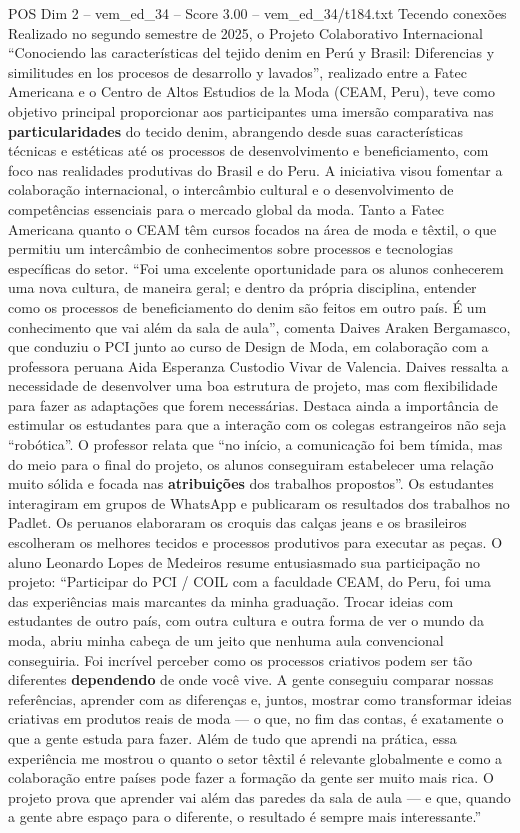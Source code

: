 \begin{textsample}{POS Dim 2 – vem\_ed\_34 – Score 3.00 – vem\_ed\_34/t184.txt}  \label{ex:f2_pos_006}
Tecendo conexões Realizado no segundo semestre de 2025, o Projeto Colaborativo Internacional “Conociendo las características del tejido denim en Perú y Brasil: Diferencias y similitudes en los procesos de desarrollo y lavados”, realizado entre a Fatec Americana e o Centro de Altos Estudios de la Moda (CEAM, Peru), teve como objetivo principal proporcionar aos participantes uma imersão comparativa nas \textbf{particularidades} do tecido denim, abrangendo desde suas características técnicas e estéticas até os processos de desenvolvimento e beneficiamento, com foco nas realidades produtivas do Brasil e do Peru.
A iniciativa visou fomentar a colaboração internacional, o intercâmbio cultural e o desenvolvimento de competências essenciais para o mercado global da moda.
Tanto a Fatec Americana quanto o CEAM têm cursos focados na área de moda e têxtil, o que permitiu um intercâmbio de conhecimentos sobre processos e tecnologias específicas do setor. “Foi uma excelente oportunidade para os alunos conhecerem uma nova cultura, de maneira geral; e dentro da própria disciplina, entender como os processos de beneficiamento do denim são feitos em outro país.
É um conhecimento que vai além da sala de aula”, comenta Daives Araken Bergamasco, que conduziu o PCI junto ao curso de Design de Moda, em colaboração com a professora peruana Aida Esperanza Custodio Vivar de Valencia.
Daives ressalta a necessidade de desenvolver uma boa estrutura de projeto, mas com flexibilidade para fazer as adaptações que forem necessárias.
Destaca ainda a importância de estimular os estudantes para que a interação com os colegas estrangeiros não seja “robótica”.
O professor relata que “no início, a comunicação foi bem tímida, mas do meio para o final do projeto, os alunos conseguiram estabelecer uma relação muito sólida e focada nas \textbf{atribuições} dos trabalhos propostos”.
Os estudantes interagiram em grupos de WhatsApp e publicaram os resultados dos trabalhos no Padlet.
Os peruanos elaboraram os croquis das calças jeans e os brasileiros escolheram os melhores tecidos e processos produtivos para executar as peças.
O aluno Leonardo Lopes de Medeiros resume entusiasmado sua participação no projeto: “Participar do PCI / COIL com a faculdade CEAM, do Peru, foi uma das experiências mais marcantes da minha graduação.
Trocar ideias com estudantes de outro país, com outra cultura e outra forma de ver o mundo da moda, abriu minha cabeça de um jeito que nenhuma aula convencional conseguiria.
Foi incrível perceber como os processos criativos podem ser tão diferentes \textbf{dependendo} de onde você vive.
A gente conseguiu comparar nossas referências, aprender com as diferenças e, juntos, mostrar como transformar ideias criativas em produtos reais de moda — o que, no fim das contas, é exatamente o que a gente estuda para fazer.
Além de tudo que aprendi na prática, essa experiência me mostrou o quanto o setor têxtil é relevante globalmente e como a colaboração entre países pode fazer a formação da gente ser muito mais rica.
O projeto prova que aprender vai além das paredes da sala de aula — e que, quando a gente abre espaço para o diferente, o resultado é sempre mais interessante.”

\end{textsample}
